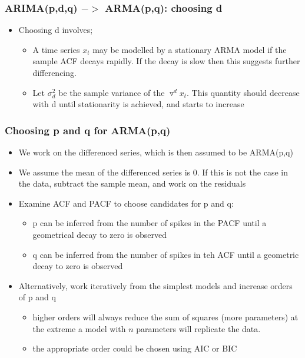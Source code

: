 \documentclass{article}
\begin{document}
\subsubsection{ARIMA(p,d,q) $->$ ARMA(p,q): choosing d}
\begin{itemize}
    \item Choosing d involves;
    \begin{itemize}
        \item A time series $x_t$ may be modelled by a stationary ARMA model if the sample ACF decays rapidly. If the decay is slow then this suggests further differencing.
        \item Let $\sigma^2_d$ be the sample variance of the $\triangledown^d x_t$. This quantity should decrease with d until stationarity is achieved, and starts to increase
    \end{itemize}
\end{itemize}


\subsubsection{Choosing p and q for ARMA(p,q)}
\begin{itemize}
    \item We work on the differenced series, which is then assumed to be ARMA(p,q)
    \item We assume the mean of the differenced series is 0. If this is not the case in the data, subtract the sample mean, and work on the residuals
    \item Examine ACF and PACF to choose candidates for p and q:
    \begin{itemize}
        \item p can be inferred from the number of spikes in the PACF until a geometrical decay to zero is observed
        \item q can be inferred from the number of spikes in teh ACF until a geometric decay to zero is observed
    \end{itemize}
    \item Alternatively, work iteratively from the simplest models and increase orders of p and q
    \begin{itemize}
        \item higher orders will always reduce the sum of squares (more parameters) at the extreme a model with $n$ parameters will replicate the data.
        \item the appropriate order could be chosen using AIC or BIC
    \end{itemize}
\end{itemize}
\end{document}
